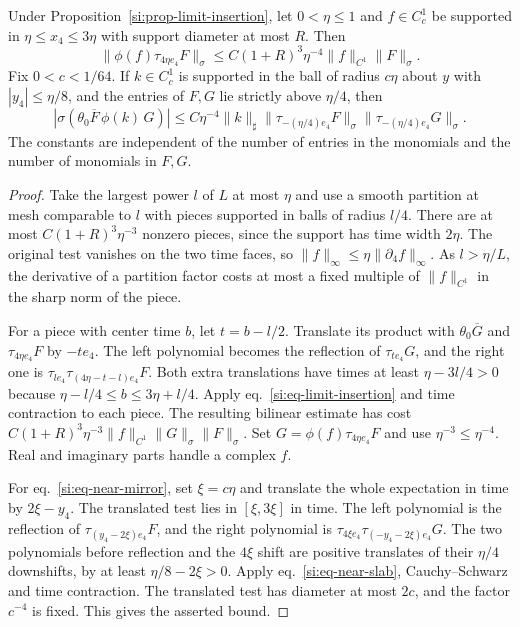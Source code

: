 \documentclass[11pt,letterpaper,reqno]{amsart}
\makeatletter
\numberwithin{equation}{section}
\renewcommand{\eqref}[1]{\textup{eq.~\ref{#1}}}
\theoremstyle{definition}
\newcommand{\ms@majorstart}{%
  \pushQED{\qed}\renewcommand{\qedsymbol}{$\blacksquare\square$}}
\newenvironment{corollary}[1][]{\ms@majorstart\ms@corollary[#1]}
  {\popQED\endms@corollary}
\theoremstyle{remark}
\makeatother
\begin{document}
\begin{samepage}
\begin{corollary}[Near-mirror insertion]\label{si:cor-mirror-insertion}
Under Proposition~\ref{si:prop-limit-insertion}, let
$0<\eta\le1$ and $f\in C_c^1$ be supported in
$\eta\le x_4\le3\eta$ with support diameter at most $R$. Then
\begin{equation}\label{si:eq-near-slab}
 \|\phi(f)\tau_{4\eta e_4}F\|_\sigma
 \le C(1+R)^3\eta^{-4}\|f\|_{C^1}\|F\|_\sigma .
\end{equation}
Fix $0<c<1/64$. If $k\in C_c^1$ is supported in the ball of
radius $c\eta$ about $y$ with $|y_4|\le\eta/8$, and the
entries of $F,G$ lie strictly above $\eta/4$, then
\begin{equation}\label{si:eq-near-mirror}
 |\sigma(\theta_0\overline F\,\phi(k)\,G)|
 \le C\eta^{-4}\|k\|_\sharp
     \|\tau_{-(\eta/4)e_4}F\|_\sigma
     \|\tau_{-(\eta/4)e_4}G\|_\sigma .
\end{equation}
The constants are independent of the number of entries in the
monomials and the number of monomials in $F,G$.
\end{corollary}
\end{samepage}

\begin{proof}
Take the largest power $l$ of $L$ at most $\eta$ and use a
smooth partition at mesh comparable to $l$ with pieces
supported in balls of radius $l/4$. There are at most
$C(1+R)^3\eta^{-3}$ nonzero pieces, since the support has
time width $2\eta$. The original test vanishes on the two
time faces, so $\|f\|_\infty\le\eta\|\partial_4 f\|_\infty$.
As $l>\eta/L$, the derivative of a partition factor costs
at most a fixed multiple of $\|f\|_{C^1}$ in the sharp norm
of the piece.

For a piece with center time $b$, let $t=b-l/2$.
Translate its product with $\theta_0\overline G$ and
$\tau_{4\eta e_4}F$ by $-t e_4$. The left polynomial
becomes the reflection of $\tau_{te_4}G$, and the right
one is $\tau_{le_4}\tau_{(4\eta-t-l)e_4}F$. Both extra
translations have times at least $\eta-3l/4>0$ because
$\eta-l/4\le b\le3\eta+l/4$. Apply
\eqref{si:eq-limit-insertion} and time contraction to each
piece. The resulting bilinear estimate has cost
$C(1+R)^3\eta^{-3}\|f\|_{C^1}\|G\|_\sigma\|F\|_\sigma$.
Set $G=\phi(f)\tau_{4\eta e_4}F$ and use $\eta^{-3}\le\eta^{-4}$.
Real and imaginary parts handle a complex $f$.

For \eqref{si:eq-near-mirror}, set $\xi=c\eta$ and translate
the whole expectation in time by $2\xi-y_4$. The translated
test lies in $[\xi,3\xi]$ in time. The left polynomial is
the reflection of $\tau_{(y_4-2\xi)e_4}F$, and the right
polynomial is $\tau_{4\xi e_4}\tau_{(-y_4-2\xi)e_4}G$.
The two polynomials before reflection and the $4\xi$ shift
are positive translates of their $\eta/4$ downshifts, by
at least $\eta/8-2\xi>0$. Apply \eqref{si:eq-near-slab},
Cauchy--Schwarz and time contraction. The translated test
has diameter at most $2c$, and the factor $c^{-4}$ is
fixed. This gives the asserted bound.
\end{proof}
\end{document}
